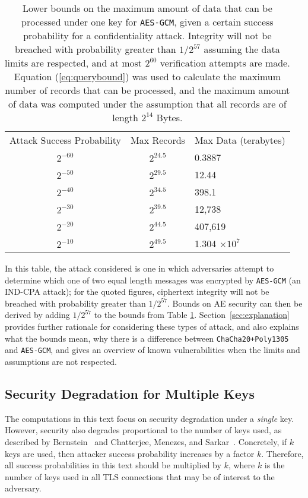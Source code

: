 \documentclass{article}
\begin{document}
\medskip
\begin{table}[H]
  \centering
  \caption{Lower bounds on the maximum amount of data that can be processed under one key for \texttt{AES-GCM}, given a certain success probability for a confidentiality attack. Integrity will not be breached with probability greater than $1/2^{57}$ assuming the data limits are respected, and at most $2^{60}$ verification attempts are made. Equation (\ref{eq:querybound}) was used to calculate the maximum number of records that can be processed, and the maximum amount of data was computed under the assumption that all records are of length $2^{14}$ Bytes.}\label{table:gcm-bounds}
  \begin{tabular}{ccl}
    \toprule
    Attack Success Probability  & Max Records & Max Data (terabytes)\\
    \cmidrule{1-3}
    $2^{-60}$ & $2^{24.5}$ & 0.3887\\
    $2^{-50}$ & $2^{29.5}$ & 12.44 \\
    $2^{-40}$ & $2^{34.5}$ & 398.1\\
    $2^{-30}$ & $2^{39.5}$ & 12,738\\
    $2^{-20}$ & $2^{44.5}$ & 407,619\\
    $2^{-10}$ & $2^{49.5}$ & 1.304 $\times 10^7$\\
    \bottomrule
  \end{tabular}
\end{table}
\medskip

In this table, the attack considered is one in which adversaries attempt to determine which one of two equal length messages was encrypted by \texttt{AES-GCM} (an IND-CPA attack); for the quoted figures, ciphertext integrity will not be breached with probability greater than $1/2^{57}$. Bounds on AE security can then be derived by adding  $1/2^{57}$ to the bounds from Table \ref{table:gcm-bounds}. Section~\ref{sec:explanation} provides further rationale for considering these types of attack, and also explains what the bounds mean, why there is a difference between \texttt{ChaCha20+Poly1305} and \texttt{AES-GCM}, and gives an overview of known vulnerabilities when the limits and assumptions are not respected.

\subsection{Security Degradation for Multiple Keys}

The computations in this text focus on security degradation under a \emph{single} key. However, security also degrades proportional to the number of keys used, as described by Bernstein~\cite{bernsteinblog} and Chatterjee, Menezes, and Sarkar~\cite{DBLP:conf/sacrypt/ChatterjeeMS11,DBLP:journals/iacr/ChatterjeeMS11}. Concretely, if $k$ keys are used, then attacker success probability increases by a factor $k$. Therefore, all success probabilities in this text should be multiplied by $k$, where $k$ is the number of keys used in all TLS connections that may be of interest to the adversary. %
\end{document}
